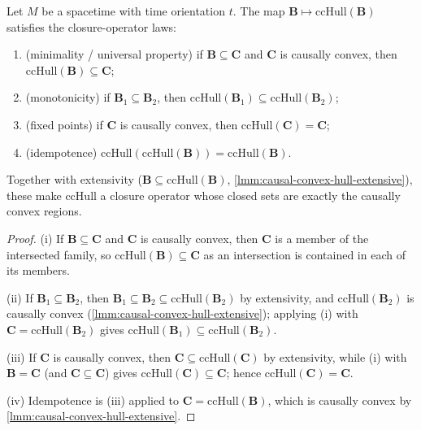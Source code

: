 \medskip

\begin{theorem}
    \label{thrm:causal-convex-hull-closure}
    \leanok
    Let $M$ be a spacetime with time orientation $t$. The map $\mathbf{B} \mapsto \mathrm{ccHull}(\mathbf{B})$ satisfies the closure-operator laws:
    \begin{enumerate}
        \item (minimality / universal property) if $\mathbf{B} \subseteq \mathbf{C}$ and $\mathbf{C}$ is causally convex, then $\mathrm{ccHull}(\mathbf{B}) \subseteq \mathbf{C}$;
        \item (monotonicity) if $\mathbf{B}_1 \subseteq \mathbf{B}_2$, then $\mathrm{ccHull}(\mathbf{B}_1) \subseteq \mathrm{ccHull}(\mathbf{B}_2)$;
        \item (fixed points) if $\mathbf{C}$ is causally convex, then $\mathrm{ccHull}(\mathbf{C}) = \mathbf{C}$;
        \item (idempotence) $\mathrm{ccHull}(\mathrm{ccHull}(\mathbf{B})) = \mathrm{ccHull}(\mathbf{B})$.
    \end{enumerate}
    Together with extensivity ($\mathbf{B} \subseteq \mathrm{ccHull}(\mathbf{B})$, \ref{lmm:causal-convex-hull-extensive}), these make $\mathrm{ccHull}$ a closure operator whose closed sets are exactly the causally convex regions.
\end{theorem}
\begin{proof}
    \leanok
    (i) If $\mathbf{B} \subseteq \mathbf{C}$ and $\mathbf{C}$ is causally convex, then $\mathbf{C}$ is a member of the intersected family, so $\mathrm{ccHull}(\mathbf{B}) \subseteq \mathbf{C}$ as an intersection is contained in each of its members.

    (ii) If $\mathbf{B}_1 \subseteq \mathbf{B}_2$, then $\mathbf{B}_1 \subseteq \mathbf{B}_2 \subseteq \mathrm{ccHull}(\mathbf{B}_2)$ by extensivity, and $\mathrm{ccHull}(\mathbf{B}_2)$ is causally convex (\ref{lmm:causal-convex-hull-extensive}); applying (i) with $\mathbf{C} = \mathrm{ccHull}(\mathbf{B}_2)$ gives $\mathrm{ccHull}(\mathbf{B}_1) \subseteq \mathrm{ccHull}(\mathbf{B}_2)$.

    (iii) If $\mathbf{C}$ is causally convex, then $\mathbf{C} \subseteq \mathrm{ccHull}(\mathbf{C})$ by extensivity, while (i) with $\mathbf{B} = \mathbf{C}$ (and $\mathbf{C} \subseteq \mathbf{C}$) gives $\mathrm{ccHull}(\mathbf{C}) \subseteq \mathbf{C}$; hence $\mathrm{ccHull}(\mathbf{C}) = \mathbf{C}$.

    (iv) Idempotence is (iii) applied to $\mathbf{C} = \mathrm{ccHull}(\mathbf{B})$, which is causally convex by \ref{lmm:causal-convex-hull-extensive}.
\end{proof}

